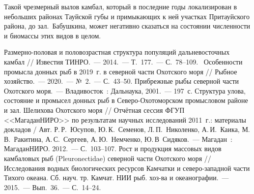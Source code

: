 Такой чрезмерный вылов камбал, который в последние годы локализирован в небольших районах Тауйской губы и примыкающих к ней участках Притауйского района, до зал.~Бабушкина, может негативно сказаться на состоянии численности и биомассы этих видов в целом.


\begin{thebibliography}{99}

\bibitem{}
 Размерно-половая и половозрастная структура популяций дальневосточных камбал // Известия ТИНРО.~--- 2014.~--- Т.~177.~--- С.~78--109.
\bibitem{}
 Особенности промысла донных рыб в 2019~г. в северной части Охотского моря // Рыбное хозяйство.~--- 2020.~--- №~2.~--- С.~43--50.
\bibitem{}
 Прибрежные рыбы северной части Охотского моря.~--- Владивосток~: Дальнаука, 2001.~--- 197~с.
\bibitem{}
 Структура улова, состояние и промысел донных рыб в Северо-Охотоморском промысловом районе и зал. Шелихова Охотского моря  // Отчётная сессия ФГУП <<МагаданНИРО>> по результатам научных исследований 2011~г.: материалы докладов / Авт. Р.\,Р.~Юсупов, Ю.\,К.~Семенов, Л.\,П.~Николенко, А.\,И.~Каика, М.\,В.~Ракитина, А.\,С.~Сергеев, А.\,Ю.~Немченко, Ю.\,В~Сидяков.~--- Магадан~: МагаданНИРО. 2012.~--- С.~103--107.
\bibitem{}
 Рост и продукция массовых видов камбаловых рыб (Pleuronectidae) северной части Охотского моря // Исследования водных биологических ресурсов Камчатки и северо-западной части Тихого океана. Сб. науч. тр. Камчат. НИИ рыб. хоз-ва и океанографии.~--- 2015.~--- Вып.~36.~--- С.~14--24.
\end{thebibliography}
